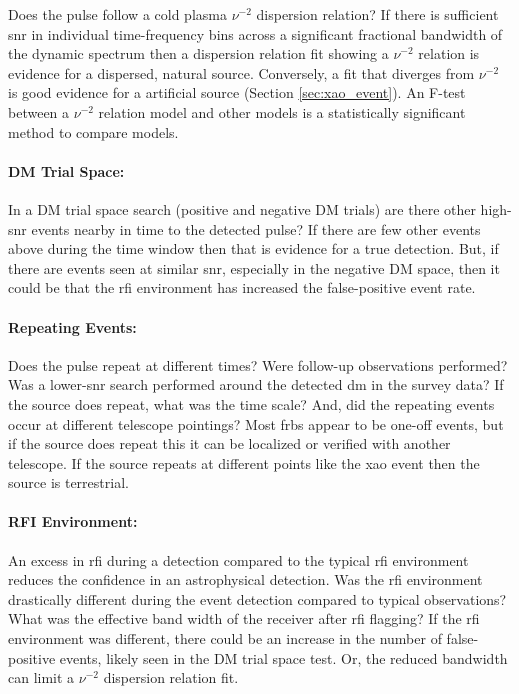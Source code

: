 \documentclass[a4paper,fleqn,usenatbib]{mnras}
\begin{document}
Does the pulse follow a cold plasma $\nu^{-2}$ dispersion relation? If there is
sufficient \gls{snr} in individual time-frequency bins across a significant
fractional bandwidth of the dynamic spectrum then a dispersion relation fit
showing a $\nu^{-2}$ relation is evidence for a dispersed, natural source.
Conversely, a fit that diverges from $\nu^{-2}$ is good evidence for a
artificial source (Section \ref{sec:xao_event}). An F-test between a $\nu^{-2}$
relation model and other models is a statistically significant method to compare
models.

\paragraph{DM Trial Space:}

In a DM trial space search (positive and negative DM trials) are there other
high-\gls{snr} events nearby in time to the detected pulse? If there are few
other events above during the time window then that is evidence for a true
detection. But, if there are events seen at similar \gls{snr}, especially in the
negative DM space, then it could be that the \gls{rfi} environment has
increased the false-positive event rate.

\paragraph{Repeating Events:}

Does the pulse repeat at different times? Were follow-up observations performed?
Was a lower-\gls{snr} search performed around the detected \gls{dm} in the
survey data? If the source does repeat, what was the time scale? And, did the
repeating events occur at different telescope pointings? Most \glspl{frb} appear
to be one-off events, but if the source does repeat this it can be localized or
verified with another telescope. If the source repeats at different points like
the \gls{xao} event then the source is terrestrial.

\paragraph{RFI Environment:}

An excess in \gls{rfi} during a detection compared to the typical \gls{rfi}
environment reduces the confidence in an astrophysical detection.  Was the
\gls{rfi} environment drastically different during the event detection compared
to typical observations? What was the effective band width of the receiver after
\gls{rfi} flagging? If the \gls{rfi} environment was different, there could be
an increase in the number of false-positive events, likely seen in the DM trial
space test. Or, the reduced bandwidth can limit a $\nu^{-2}$ dispersion relation
fit.
\end{document}
